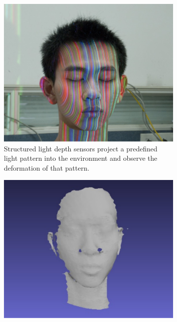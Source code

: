 \begin{figure}[H]
    \centering
    \begin{subfigure}[t]{0.45\textwidth}
        \includegraphics[width=\textwidth]{chapter03/img/depth_pattern_face.png}
        \caption{Structured light depth sensors project a predefined light pattern into the environment and observe the deformation of that pattern\cite{sl_depthsensor_calibration}.}
    \end{subfigure}
    \begin{subfigure}[t]{0.45\textwidth}
        \includegraphics[width=\textwidth]{chapter03/img/depth_face_reconstructed.png}

\end{subfigure}
\end{figure}
